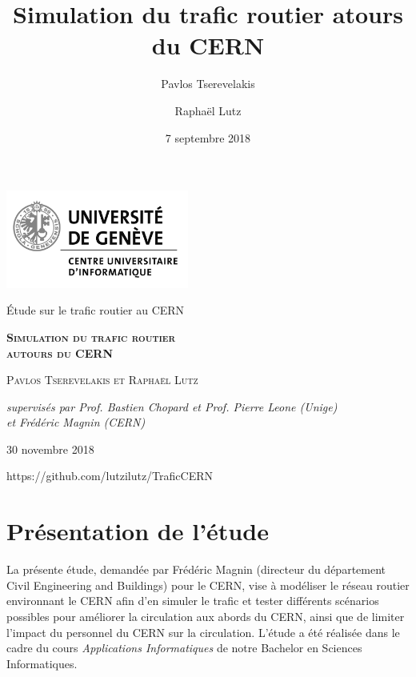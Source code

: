\documentclass[a4paper,11pt, titlepage]{extarticle}
\title{Simulation du trafic routier atours du CERN}
\author{Pavlos Tserevelakis \and Raphaël Lutz}
\date{7 septembre 2018}
\begin{document}
\begin{titlepage}
	\centering
	\includegraphics[width=0.45\textwidth]{logoUni.jpg}\par
	\vspace{3cm}
	{\Large Étude sur le trafic routier au CERN \par}
	\vspace{1.5cm}
	{\scshape\huge\bfseries Simulation du trafic routier\\autours du CERN\par}
	\vspace{1.5cm}
	{\scshape\Large Pavlos Tserevelakis et Raphaël Lutz\par}
	\vspace{1.5cm}
	{\large\itshape supervisés par Prof. Bastien Chopard et Prof. Pierre Leone (Unige)\\et Frédéric Magnin (CERN)\par}
	\vspace{1.5cm}
	{30 novembre 2018\par}
	\vspace{6.5cm}
	{https://github.com/lutzilutz/TraficCERN\par}
	\vfill
\end{titlepage}


\tableofcontents\newpage

\section{Présentation de l'étude}

La présente étude, demandée par Frédéric Magnin (directeur du département Civil Engineering and Buildings) pour le CERN, vise à modéliser le réseau routier environnant le CERN afin d'en simuler le trafic et tester différents scénarios possibles pour améliorer la circulation aux abords du CERN, ainsi que de limiter l'impact du personnel du CERN sur la circulation. L'étude a été réalisée dans le cadre du cours \emph{Applications Informatiques} de notre Bachelor en Sciences Informatiques.
\end{document}
